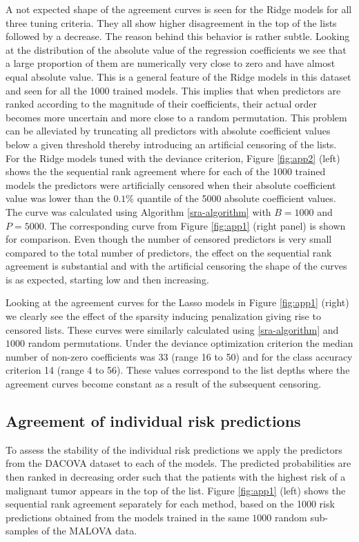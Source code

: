 \documentclass[12pt,a4paper]{article}
\theoremstyle{plain}
\begin{document}
A not expected shape of the agreement curves is seen for the Ridge
models for all three tuning criteria. They all show higher
disagreement in the top of the lists followed by a decrease. The
reason behind this behavior is rather subtle. Looking at the
distribution of the absolute value of the regression coefficients we see that a large
proportion of them are numerically very close to zero and have almost
equal absolute value. This is a general feature of the Ridge models in
this dataset and seen for all the 1000 trained models.
This implies that when predictors are ranked according to the
magnitude of their coefficients, their actual order becomes more
uncertain and more close to a random permutation. This problem can be
alleviated by truncating all predictors with absolute coefficient values
below a given threshold thereby introducing an artificial censoring of the lists.
For the Ridge models tuned with the deviance criterion, Figure \ref{fig:app2} (left) shows the
the sequential rank agreement where for each of the 1000 trained
models the predictors were artificially censored when their absolute
coefficient value was lower than the $0.1\%$ quantile of the 5000
absolute coefficient values. The curve was calculated
using Algorithm \ref{sra-algorithm} with $B=1000$ and $P=5000$. The corresponding
curve from Figure \ref{fig:app1} (right panel) is shown for comparison.
Even though the number of censored predictors is very small compared to the total
number of predictors, the effect on the sequential rank agreement is
substantial and with the artificial censoring the shape of the curves
is as expected, starting low and then increasing.

Looking at the agreement curves for the Lasso models in Figure \ref{fig:app1}
(right) we clearly see the effect of the sparsity inducing penalization giving
rise to censored lists. These curves were similarly calculated using \ref{sra-algorithm}
and $1000$ random permutations. Under the deviance optimization criterion the
median number of non-zero coefficients was 33 (range 16 to 50) and for the
class accuracy criterion 14 (range 4 to 56). These values correspond to
the list depths where the agreement curves become constant as a result of
the subsequent censoring.




\subsection{Agreement of individual risk predictions}
\label{sec:airp}
To assess the stability of the individual risk predictions we apply
the predictors from the DACOVA dataset to each of the models. The
predicted probabilities are then ranked in decreasing order such that the
patients with the highest risk of a malignant tumor appears in the top
of the list. Figure \ref{fig:app1} (left) shows the sequential rank
agreement separately for each method, based on the 1000 risk predictions
obtained from the models trained in the same $1000$ random sub-samples
of the MALOVA data.
\end{document}
